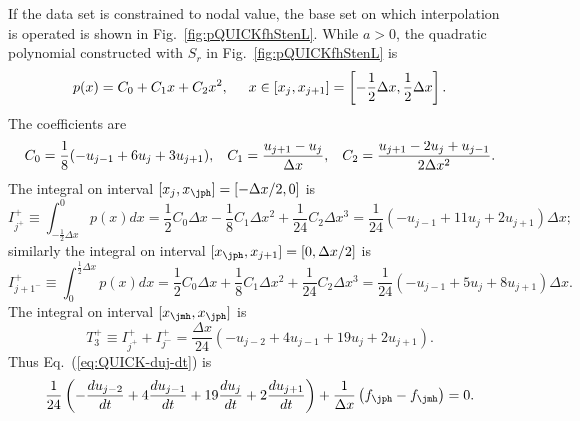 \documentclass[]{article}
\begin{document}
If the data set is constrained to nodal value, the base set on which
interpolation is operated is shown in Fig.~\ref{fig:pQUICKfhStenL}. While
$a>0$, the quadratic polynomial constructed with $S_r$ in
Fig.~\ref{fig:pQUICKfhStenL} is
\begin{equation*}
    p(x) = C_0+C_1x+C_2x^2,\hspace{5mm} x\in [x_j,x_{j+1}]=\left[-\frac{1}{2}\Delta x,\frac{1}{2}\Delta x\right].
\end{equation*}
The coefficients are
\begin{equation*}
    C_0=\frac{1}{8}(-u_{j-1}+6u_j+3u_{j+1}),\hspace{3mm}
    C_1 = \frac{u_{j+1}-u_j}{\Delta x},\hspace{3mm}
    C_2 = \frac{u_{j+1}-2u_j+u_{j-1}}{2\Delta x^2}.
\end{equation*}
The integral on interval $[x_j,x_{\jph}]=[-\Delta x/2,0]$ is
\begin{equation*}
    I^+_{j^+}\equiv\int_{-\frac{1}{2}\Delta x}^0 p(x)dx = \frac{1}{2}C_0\Delta x-\frac{1}{8}C_1\Delta x^2+\frac{1}{24}C_2\Delta x^3
    =\frac{1}{24}(-u_{j-1}+11u_j+2u_{j+1})\Delta x;
\end{equation*}
similarly the integral on interval $[x_{\jph},x_{j+1}]=[0,\Delta x/2]$ is
\begin{equation*}
    I^+_{j+1^-}\equiv\int_0^{\frac{1}{2}\Delta x} p(x)dx = \frac{1}{2}C_0\Delta x+\frac{1}{8}C_1\Delta x^2+\frac{1}{24}C_2\Delta x^3
    =\frac{1}{24}(-u_{j-1}+5u_j+8u_{j+1})\Delta x.
\end{equation*}
The integral on interval $[x_{\jmh},x_{\jph}]$ is
\begin{equation*}
    T_3^+\equiv I^+_{j^+}+I^+_{j^-} = \frac{\Delta x}{24}(-u_{j-2}+4u_{j-1}+19u_j+2u_{j+1}).
\end{equation*}
Thus Eq.~(\ref{eq:QUICK-duj-dt}) is 
\begin{equation}
    \frac{1}{24}\left(-\frac{d u_{j-2}}{dt}+4\frac{du_{j-1}}{dt}+19\frac{du_j}{dt}+2\frac{du_{j+1}}{dt}\right)
    +\frac{1}{\Delta x}\left(f_{\jph}-f_{\jmh}\right)=0.
    \label{eq:intx1}
\end{equation}
\end{document}
